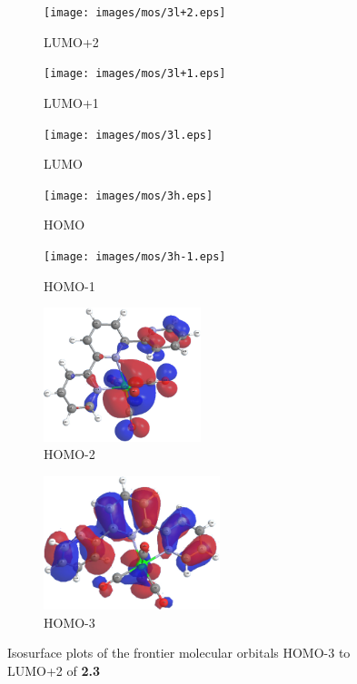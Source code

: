 \begin{figure}[!ht]
 \centering
 \begin{subfigure}[b]{0.31\textwidth}
  \texttt{[image: images/mos/3l+2.eps]}
  \caption{LUMO+2}
 \end{subfigure}
  \begin{subfigure}[b]{0.31\textwidth}
  \texttt{[image: images/mos/3l+1.eps]}
  \caption{LUMO+1}
 \end{subfigure}
  \begin{subfigure}[b]{0.31\textwidth}
  \texttt{[image: images/mos/3l.eps]}
  \caption{LUMO}
 \end{subfigure}
 \begin{subfigure}[b]{0.31\textwidth}
  \texttt{[image: images/mos/3h.eps]}
  \caption{HOMO}
 \end{subfigure}
 \begin{subfigure}[b]{0.31\textwidth}
  \texttt{[image: images/mos/3h-1.eps]}
  \caption{HOMO-1}
 \end{subfigure}
 \begin{subfigure}[b]{0.31\textwidth}
  \includegraphics[clip=true, width=\textwidth, height=39mm, keepaspectratio]{images/mos/3h-2.eps}
  \caption{HOMO-2}
 \end{subfigure}
 \begin{subfigure}[b]{0.31\textwidth}
  \includegraphics[clip=true, width=\textwidth, height=39mm, keepaspectratio]{images/mos/3h-3.eps}
  \caption{HOMO-3}
 \end{subfigure}
\caption[Molecular orbitals HOMO-3 to LUMO+2 of \textbf{2.3}]{Isosurface plots of the frontier molecular orbitals HOMO-3 to LUMO+2 of \textbf{2.3}}
\label{fig.mo23}
\end{figure} 

